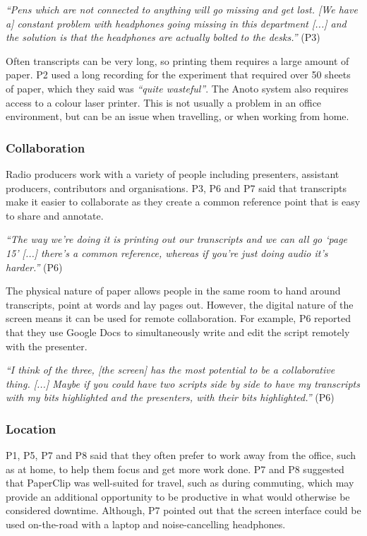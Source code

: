 \textit{``Pens which are not connected to anything will go missing and get lost.
  [We have a] constant problem with headphones going missing in this department [...]
and the solution is that the headphones are actually bolted to the desks.''} (P3)

Often transcripts can be very long, so printing them requires a large amount of paper. P2 used a long recording
for the experiment that required over 50 sheets of paper, which they said was \textit{``quite wasteful''}.
The Anoto system also requires access to a colour laser printer.
This is not usually a problem in an office environment, but can be an issue when travelling, or when
working from home.







\subsubsection{Collaboration}
Radio producers work with a variety of people including presenters, assistant producers, contributors and
organisations.  P3, P6 and P7 said that transcripts make it easier to collaborate as they create a common reference
point that is easy to share and annotate.

\textit{``The way we're doing it is printing out our transcripts and we can all go `page 15' [...]
there's a common reference, whereas if you're just doing audio it's harder.''} (P6)

The physical nature of paper allows people in the same room to hand around transcripts, point at words and lay pages
out. However, the digital nature of the screen means it can be used for remote collaboration. For example, P6 reported
that they use Google Docs to simultaneously write and edit the script remotely with the presenter.



\textit{``I think of the three, [the screen] has the most potential to be a collaborative thing. [...]
  Maybe if you could have two scripts side by side to have my transcripts with my bits highlighted and the presenters,
with their bits highlighted.''} (P6)



\subsubsection{Location}
P1, P5, P7 and P8 said that they often prefer to work away from the office, such as at home, to help them focus and get
more work done.  P7 and P8 suggested that PaperClip was well-suited for travel, such as during commuting, which
may provide an additional opportunity to be productive in what would otherwise be considered downtime.  Although, P7
pointed out that the screen interface could be used on-the-road with a laptop and noise-cancelling headphones. 


